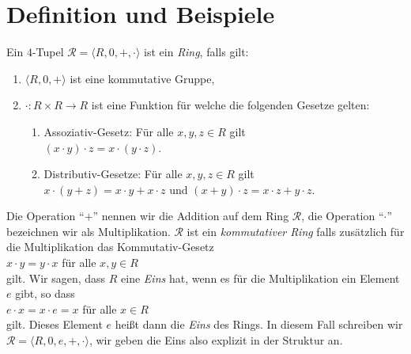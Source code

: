 \section{Definition und Beispiele}
\begin{Definition}[Ring]
Ein $4$-Tupel $\mathcal{R} = \langle R, 0, +, \cdot \rangle$ ist ein \emph{Ring}, falls gilt:
\begin{enumerate}
\item $\langle R, 0, + \rangle$ ist eine kommutative Gruppe,
\item $\cdot: R \times R \rightarrow R$ ist eine Funktion für welche die folgenden Gesetze gelten:
      \begin{enumerate}
      \item Assoziativ-Gesetz:  Für alle $x, y,z \in R$ gilt
            \\[0.2cm]
            \hspace*{1.3cm}
            $(x \cdot y) \cdot z = x \cdot (y \cdot z)$.
      \item Distributiv-Gesetze: Für alle $x, y,z \in R$ gilt
            \\[0.2cm]
            \hspace*{1.3cm} 
            $x \cdot (y + z) = x \cdot y + x \cdot z$ \quad und \quad
            $(x + y) \cdot z = x \cdot z + y \cdot z$.
      \end{enumerate}
\end{enumerate}
Die Operation ``$+$'' nennen wir die Addition auf dem Ring $\mathcal{R}$, die Operation ``$\cdot$'' bezeichnen 
wir als Multiplikation.
$\mathcal{R}$ ist ein \emph{kommutativer Ring} falls zusätzlich für die Multiplikation
das Kommutativ-Gesetz
\\[0.2cm]
\hspace*{1.3cm}
$x \cdot y = y \cdot x$ \quad für alle $x,y \in R$
\\[0.2cm]
gilt.  Wir sagen, dass $R$ eine \emph{Eins} hat, wenn es für die Multiplikation ein Element $e$ gibt, so dass
\\[0.2cm]
\hspace*{1.3cm}
$e \cdot x = x \cdot e = x$ \quad für alle $x \in R$
\\[0.2cm]
gilt.  Dieses Element $e$ heißt dann die \emph{Eins} des Rings.  In diesem Fall schreiben wir
$\mathcal{R} = \langle R, 0, e, +, \cdot \rangle$, wir geben die Eins also explizit in der Struktur
an.
\eox
\end{Definition}

